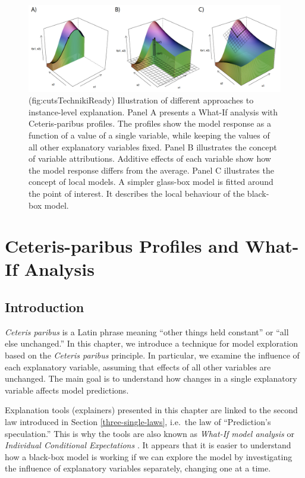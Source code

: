 \documentclass[12pt,]{krantz}
\begin{document}
\begin{figure}

{\centering \includegraphics[width=0.99\linewidth]{figure/cuts_techniki_ready} 

}

\caption{(fig:cutsTechnikiReady) Illustration of different approaches to instance-level explanation. Panel A presents a What-If analysis with Ceteris-paribus profiles. The profiles show the model response as a function of a value of a single variable, while keeping the values of all other explanatory variables fixed. Panel B illustrates the concept of variable attributions. Additive effects of each variable show how the model response differs from the average. Panel C illustrates the concept of local models. A simpler glass-box model is fitted around the point of interest. It describes the local behaviour of the black-box model. }\label{fig:cutsTechnikiReady}
\end{figure}

\hypertarget{ceterisParibus}{%
\section{Ceteris-paribus Profiles and What-If Analysis}\label{ceterisParibus}}

\hypertarget{CPIntro}{%
\subsection{Introduction}\label{CPIntro}}

\emph{Ceteris paribus} is a Latin phrase meaning ``other things held constant'' or ``all else unchanged.'' In this chapter, we introduce a technique for model exploration based on the \emph{Ceteris paribus} principle. In particular, we examine the influence of each explanatory variable, assuming that effects of all other variables are unchanged. The main goal is to understand how changes in a single explanatory variable affects model predictions.

Explanation tools (explainers) presented in this chapter are linked to the second law introduced in Section \ref{three-single-laws}, i.e.~the law of ``Prediction's speculation.'' This is why the tools are also known as \emph{What-If model analysis} or \emph{Individual Conditional Expectations} \citep{ICEbox}. It appears that it is easier to understand how a black-box model is working if we can explore the model by investigating the influence of explanatory variables separately, changing one at a time.
\end{document}
